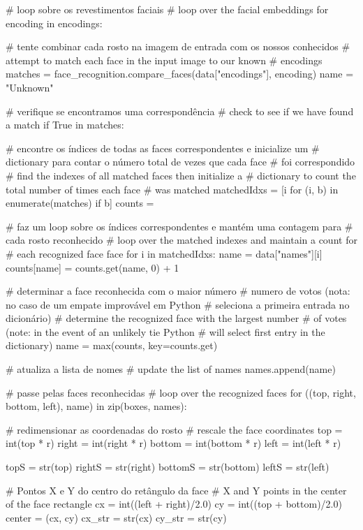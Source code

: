 \begin{apendicesenv}
\begin{python_}
	# loop sobre os revestimentos faciais  
	# loop over the facial embeddings
	for encoding in encodings:	
	
		# tente combinar cada rosto na imagem de entrada com os nossos conhecidos
		# attempt to match each face in the input image to our known
		# encodings
		matches = face_recognition.compare_faces(data["encodings"],
		encoding)
		name = "Unknown"
		
		# verifique se encontramos uma correspondência
		# check to see if we have found a match
		if True in matches:
		
			# encontre os índices de todas as faces correspondentes e inicialize um
			# dictionary para contar o número total de vezes que cada face
			# foi correspondido
			# find the indexes of all matched faces then initialize a
			# dictionary to count the total number of times each face
			# was matched
			matchedIdxs = [i for (i, b) in enumerate(matches) if b]
			counts = {}
			
			# faz um loop sobre os índices correspondentes e mantém uma contagem para
			# cada rosto reconhecido
			# loop over the matched indexes and maintain a count for
			# each recognized face face
			for i in matchedIdxs:
				name = data["names"][i]
				counts[name] = counts.get(name, 0) + 1
			
			# determinar a face reconhecida com o maior número
			# numero de votos (nota: no caso de um empate improvável em Python
			# seleciona a primeira entrada no dicionário)
			# determine the recognized face with the largest number
			# of votes (note: in the event of an unlikely tie Python
			# will select first entry in the dictionary)
			name = max(counts, key=counts.get)
		
		# atualiza a lista de nomes
		# update the list of names
		names.append(name)
	
	# passe pelas faces reconhecidas
	# loop over the recognized faces
	for ((top, right, bottom, left), name) in zip(boxes, names):
	
		# redimensionar as coordenadas do rosto
		# rescale the face coordinates
		top = int(top * r)
		right = int(right * r)
		bottom = int(bottom * r)
		left = int(left * r)
		
		topS = str(top)
		rightS = str(right)
		bottomS = str(bottom)
		leftS = str(left)
		
		# Pontos X e Y do centro do retângulo da face
		# X and Y points in the center of the face rectangle
		cx = int((left + right)/2.0)
		cy = int((top + bottom)/2.0)
		center = (cx, cy)
		cx_str = str(cx)
		cy_str = str(cy)
		

\end{python_}
\end{apendicesenv}

